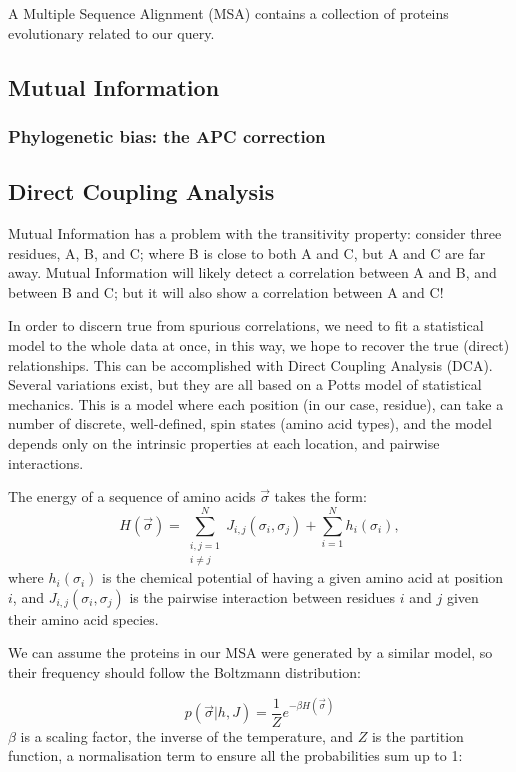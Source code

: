 A Multiple Sequence Alignment (MSA) contains a collection of proteins evolutionary related to our query.

\subsection{Mutual Information}

\subsubsection{Phylogenetic bias: the APC correction}

\subsection{Direct Coupling Analysis}
Mutual Information has a problem with the transitivity property: consider three residues, A, B, and C; where B is close to both A and C, but A and C are far away.
Mutual Information will likely detect a correlation between A and B, and between B and C; but it will also show a correlation between A and C!

In order to discern true from spurious correlations, we need to fit a statistical model to the whole data at once, in this way, we hope to recover the true (direct) relationships.
This can be accomplished with Direct Coupling Analysis (DCA).
Several variations exist, but they are all based on a Potts model of statistical mechanics.
This is a model where each position (in our case, residue), can take a number of discrete, well-defined, spin states (amino acid types), and the model depends only on the intrinsic properties at each location, and pairwise interactions.

The energy of a sequence of amino acids $\vec{\sigma}$ takes the form:
\begin{equation*}
H(\vec \sigma) = \sum_{\substack{i,j=1\\i \neq j}}^N J_{i, j}(\sigma_i, \sigma_j) + \sum_{i=1}^N h_i(\sigma_i),
\end{equation*}
where $h_i(\sigma_i)$ is the chemical potential of having a given amino acid at position $i$, and $ J_{i, j}(\sigma_i, \sigma_j)$ is the pairwise interaction between residues $i$ and $j$ given their amino acid species.

We can assume the proteins in our MSA were generated by a similar model, so their frequency should follow the Boltzmann distribution:

\begin{equation*}
p(\vec{\sigma} |  h, J) = \frac{1}{Z} e^{-\beta H\left(\vec{\sigma}\right)}
\end{equation*}
$\beta$ is a scaling factor, the inverse of the temperature, and $Z$ is the partition function, a normalisation term to ensure all the probabilities sum up to 1:

